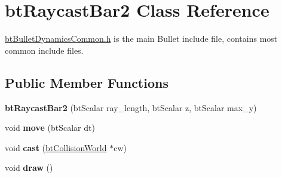 \hypertarget{classbt_raycast_bar2}{\section{bt\+Raycast\+Bar2 Class Reference}
\label{classbt_raycast_bar2}
}


\hyperlink{bt_bullet_dynamics_common_8h_source}{bt\+Bullet\+Dynamics\+Common.\+h} is the main Bullet include file, contains most common include files.  


\subsection*{Public Member Functions}
\begin{DoxyCompactItemize}
\item 
\hypertarget{classbt_raycast_bar2_a3680a1fb31f1af9103bcd04bc9a7650a}{{\bfseries bt\+Raycast\+Bar2} (bt\+Scalar ray\+\_\+length, bt\+Scalar z, bt\+Scalar max\+\_\+y)}\label{classbt_raycast_bar2_a3680a1fb31f1af9103bcd04bc9a7650a}

\item 
\hypertarget{classbt_raycast_bar2_a02fd533c910268b20b49bd07cd91aaff}{void {\bfseries move} (bt\+Scalar dt)}\label{classbt_raycast_bar2_a02fd533c910268b20b49bd07cd91aaff}

\item 
\hypertarget{classbt_raycast_bar2_a087d7e5a7a771a3bd6b67e21ac0dbe77}{void {\bfseries cast} (\hyperlink{classbt_collision_world}{bt\+Collision\+World} $\ast$cw)}\label{classbt_raycast_bar2_a087d7e5a7a771a3bd6b67e21ac0dbe77}

\item 
\hypertarget{classbt_raycast_bar2_ad5afd77e18e18b835f9b1526a1f73c41}{void {\bfseries draw} ()}\label{classbt_raycast_bar2_ad5afd77e18e18b835f9b1526a1f73c41}

\end{DoxyCompactItemize}
